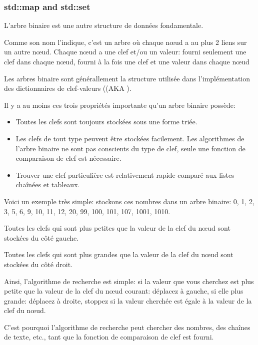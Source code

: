 \subsubsection{std::map and std::set}

L'arbre binaire est une autre structure de données fondamentale.

Comme son nom l'indique, c'est un arbre où chaque n\oe{}ud a au plus 2 liens sur un autre n\oe{}ud.
Chaque n\oe{}ud a une clef et/ou un valeur:
 fourni seulement une clef dans chaque n\oe{}ud,
 fourni à la fois une clef et une valeur dans chaque n\oe{}ud

Les arbres binaire sont générallement la structure utilisée dans l'implémentation
des dictionnaires de clef-valeurs ((\ac{AKA} ).

Il y a au moins ces trois propriétés importante qu'un arbre binaire possède:
\begin{itemize}
\item Toutes les clefs sont toujours stockées sous une forme triée.
\item Les clefs de tout type peuvent être stockées facilement.
Les algorithmes de l'arbre binaire ne sont pas conscients du type de clef, seule
une fonction de comparaison de clef est nécessaire.
\item 
Trouver une clef particulière est relativement rapide comparé aux listes chaînées
et tableaux.
\end{itemize}

Voici un exemple très simple: stockons ces nombres dans un arbre binaire:
0, 1, 2, 3, 5, 6, 9, 10, 11, 12, 20, 99, 100, 101, 107, 1001, 1010.



Toutes les clefs qui sont plus petites que la valeur de la clef du n\oe{}ud sont
stockées du côté gauche.

Toutes les clefs qui sont plus grandes que la valeur de la clef du n\oe{}ud sont
stockées du côté droit.

Ainsi, l'algorithme de recherche est simple: si la valeur que vous cherchez est plus
petite que la valeur de la clef du n\oe{}ud courant:
déplacez à gauche, si elle plus grande: déplacez à droite, stoppez si la valeur cherchée
est égale à la valeur de la clef du n\oe{}ud.

C'est pourquoi l'algorithme de recherche peut chercher des nombres, des chaînes de
texte, etc., tant que la fonction de comparaison de clef est fourni.

